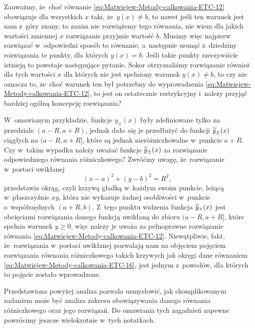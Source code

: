 \documentclass[a4paper,11pt]{article}
\begin{document}
Zauważmy, że~choć równanie \eqref{eq:Matwiejew-Metody-calkowania-ETC-12}
obowiązuje dla wszystkich $x$ taki, że~$y( x ) \neq b$, to nawet jeśli ten
warunek jest nam z~góry znany, to zanim nie rozwiążemy tego równania, nie
wiem dla jakich wartości zmiennej $x$ rozwiązanie przyjmie wartość $b$.
Musimy więc najpierw rozwiązać w~odpowiedni sposób to równanie, a~następnie
usunąć z~dziedziny rozwiązania te punkty, dla których $y( x ) = b$. Jeśli
takie punkty rzeczywiście istnieją to powstaje następujące pytanie. Sokor
otrzymaliśmy rozwiązanie również dla tych wartości $x$ dla
których nie jest spełniony warunek $y( x ) \neq b$, to czy nie oznacza to,
że~choć warunek ten był potrzebny do wyprowadzenia
\eqref{eq:Matwiejew-Metody-calkowania-ETC-12}, to jest on ostatecznie
restrykcyjny i~należy przyjąć bardziej ogólną koncepcję rozwiązania?

W~omawianym przykładzie, funkcje $y_{ \pm }( x )$ były zdefiniowane tylko na
przedziale $( a - R, a + R )$, jednak dało~się je przedłużyć do funkcji
$\widetilde{y}_{ \pm }( x )$ ciągłych na $( a - R, a + R ]$, które są jednak
nieróżniczkowalne w~punkcie $a + R$. Czy w~takim wypadku należy uważać
funkcje $\widetilde{y}_{ \pm }( x )$ za rozwiązanie odpowiedniego równania
różniczkowego? Zwróćmy uwagę, że~rozwiązanie w~postaci uwikłanej
\begin{equation}
  \label{eq:Matwiejew-Metody-calkowania-ETC-16}
  ( x - a )^{ 2 } + ( y - b )^{ 2 } = R^{ 2 },
\end{equation}
przedstawia okrąg, czyli krzywą gładką w~każdym swoim punkcie, leżącą
w~płaszczyźnie $xy$, która nie wykazuje żadnej osobliwości w~punkcie
o~współrzędnych $( a + R, b )$. Z~tego
punktu widzenia funkcja $\widetilde{y}_{ + }( x )$ jest obcięciami rozwiązania
danego funkcją uwikłaną do zbioru $( a - R, a + R ]$, które spełnia warunek
$y \geq 0$, więc należy je uważa za pełnoprawne rozwiązanie równania
\eqref{eq:Matwiejew-Metody-calkowania-ETC-12}. Niewątpliwie, fakt,
że~rozwiązania w~postaci uwikłanej pozwalają nam na objęciem pojęciem
rozwiązania równania różniczkowego takich krzywych jak okręgi dane równaniem
\eqref{eq:Matwiejew-Metody-calkowania-ETC-16}, jest jednym z~powodów, dla
których to pojęcie zostało wprowadzone.

Przedstawiona powyżej analiza pozwala uzmysłowić, jak skomplikowanym
zadaniem może być analiza zakresu obowiązywania danego równania
różniczkowego oraz jego rozwiązań. Do omawiania tych zagadnień zapewne
powrócimy jeszcze wielokrotnie w~tych notatkach.

\vspace{\VerSpaceFour}
\end{document}
